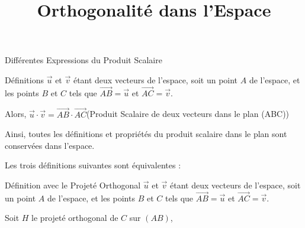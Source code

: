 \documentclass{cours}
\title{Orthogonalité dans l'Espace}
\begin{document}

    \begin{Gpartie}{Différentes Expressions du Produit Scalaire} 
        \begin{Spartie}{Définitions} 
            $\vec{u}$ et $\vec{v}$ étant deux vecteurs de l'espace, soit un point $A$ de l'espace, et les points $B$ et $C$ tels que $\overrightarrow{AB}=\vec{u}$ et $\overrightarrow{AC}=\vec{v}$.

            Alors, $\vec{u}\cdot\vec{v}=\overrightarrow{AB}\cdot\overrightarrow{AC}$\quad(Produit Scalaire de deux vecteurs dans le plan (ABC))

            Ainsi, toutes les définitions et propriétés du produit scalaire dans le plan sont conservées dans l'espace.

            Les trois définitions suivantes sont équivalentes :
            \begin{SSpartie}{Définition avec le Projeté Orthogonal} 
                $\vec{u}$ et $\vec{v}$ étant deux vecteurs de l'espace, soit un point $A$ de l'espace, et les points $B$ et $C$ tels que $\overrightarrow{AB}=\vec{u}$ et $\overrightarrow{AC}=\vec{v}$.

                Soit $H$ le projeté orthogonal de $C$ sur $(AB)$,


\end{SSpartie}
\end{Spartie}
\end{Gpartie}
\end{document}
